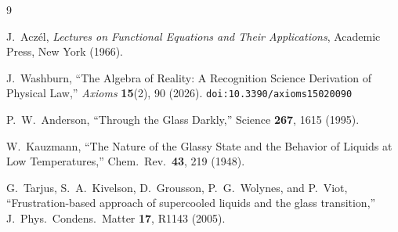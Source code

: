\documentclass[12pt,a4paper]{article}
\theoremstyle{definition}
\theoremstyle{remark}
\begin{document}
\begin{thebibliography}{9}

J.~Acz\'el, \emph{Lectures on Functional Equations and Their Applications},
Academic Press, New York (1966).

J.~Washburn, ``The Algebra of Reality: A Recognition Science Derivation
of Physical Law,'' \emph{Axioms} \textbf{15}(2), 90 (2026).
\texttt{doi:10.3390/axioms15020090}

P.~W.~Anderson, ``Through the Glass Darkly,''
Science \textbf{267}, 1615 (1995).

W.~Kauzmann, ``The Nature of the Glassy State and the Behavior of
Liquids at Low Temperatures,'' Chem.\ Rev.\ \textbf{43}, 219 (1948).

G.~Tarjus, S.~A.~Kivelson, D.~Grousson, P.~G.~Wolynes, and P.~Viot,
``Frustration-based approach of supercooled liquids and the glass transition,''
J.\ Phys.\ Condens.\ Matter \textbf{17}, R1143 (2005).
\end{thebibliography}
\end{document}
